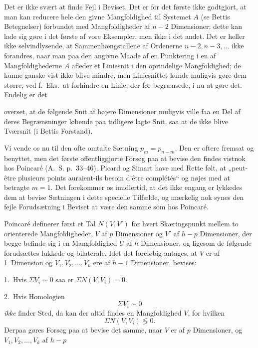 \documentclass{article}
\begin{document}
Det er ikke svært at finde Fejl i Beviset. Det er for det første ikke godtgjort, at man kan reducere hele den givne Mangfoldighed til Systemet $A$ (se Bettis Betegnelser) forbundet med Mangfoldigheder af $n - 2$ Dimensioner; dette kan lade sig gøre i det første af vore Eksempler, men ikke i det andet. Det er heller ikke selvindlysende, at Sammenhængstallene af Ordenerne $n - 2, n - 3, \dots$ ikke forandres, naar man paa den angivne Maade af en Punktering i en af Mangfoldighederne $A$ afleder et Liniesnit i den oprindelige Mangfoldighed; de kunne ganske vist ikke blive mindre, men Liniesnittet kunde muligvis gøre dem større, ved f.~Eks.\ at forhindre en Linie, der før begrænsede, i nu at gøre det. Endelig er det

overset, at de følgende Snit af højere Dimensioner muligvis ville faa en Del af deres Begrænsninger løbende paa tidligere lagte Snit, saa at de ikke blive Tværsnit (i Bettis Forstand).

Vi vende os nu til den ofte omtalte Sætning $p_m = p_{n-m}$. Den er oftere fremsat og benyttet, men det første offentliggjorte Forsøg paa at bevise den findes vistnok hos Poincaré (A.~S. p.\ 33--46). Picard og Simart have med Rette følt, at „peut-être plusieurs points auraient-ils besoin d'être complétés“ og nøjes med at betragte $m = 1$. Det forekommer os imidlertid, at det ikke engang er lykkedes dem at bevise Sætningen i dette specielle Tilfælde, og mærkelig nok synes den fejle Forudsætning i Beviset at være den samme som hos Poincaré.

Poincaré definerer først et Tal $N(V, V')$ for hvert Skæringspunkt mellem to orienterede Mangfoldigheder, $V$ af $p$ Dimensioner og $V'$ af $h - p$ Dimensioner, der begge befinde sig i en Mangfoldighed $U$ af $h$ Dimensioner, og ligesom de følgende forudsættes lukkede og bilaterale. Idet det foreløbig antages, at $V$ er af 1~Dimension og $V_1, V_2, \dots, V_k$ ere af $h - 1$ Dimensioner, bevises:

1.~Hvis $\Sigma V_i \sim 0$ saa er $\Sigma N(V, V_i) = 0$.

2.~Hvis Homologien
\[
\Sigma V_i \sim 0
\]
\emph{ikke} finder Sted, da kan der altid findes en Mangfoldighed $V$, for hvilken
\[
\Sigma N(V, V_i) \lessgtr 0.
\]
Derpaa gøres Forsøg paa at bevise det samme, naar $V$ er af $p$ Dimensioner, og $V_1, V_2, \dots, V_k$ af $h - p$
\end{document}
